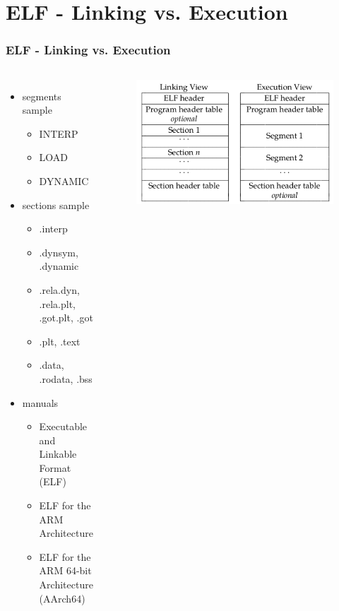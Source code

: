 \documentclass[aspectratio=169]{beamer}
\begin{document}

\section{ELF - Linking vs. Execution}
\begin{frame}
\frametitle{ELF - Linking vs. Execution}
\begin{columns}[c]
\begin{itemize}
\item segments sample
	\begin{itemize}
		\item INTERP
		\item LOAD
		\item DYNAMIC
	\end{itemize}
\item sections sample
	\begin{itemize}
		\item .interp
		\item .dynsym, .dynamic
		\item .rela.dyn, .rela.plt, .got.plt, .got
		\item .plt, .text
		\item .data, .rodata, .bss
	\end{itemize}
\item manuals
	\begin{itemize}
		\item Executable and Linkable Format (ELF)
		\item ELF for the ARM Architecture
		\item ELF for the ARM 64-bit Architecture (AArch64)
	\end{itemize}
\end{itemize}
\begin{figure}
\includegraphics[width=1.0\linewidth]{figures/elf.pdf}
\end{figure}
\end{columns}
\end{frame}
\end{document}
